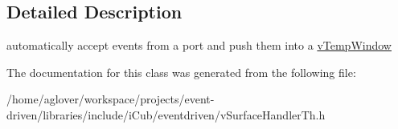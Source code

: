 \subsection{Detailed Description}
automatically accept events from a port and push them into a \hyperlink{classev_1_1vTempWindow}{v\+Temp\+Window} 

The documentation for this class was generated from the following file\+:\begin{DoxyCompactItemize}
\item 
/home/aglover/workspace/projects/event-\/driven/libraries/include/i\+Cub/eventdriven/v\+Surface\+Handler\+Th.\+h\end{DoxyCompactItemize}
